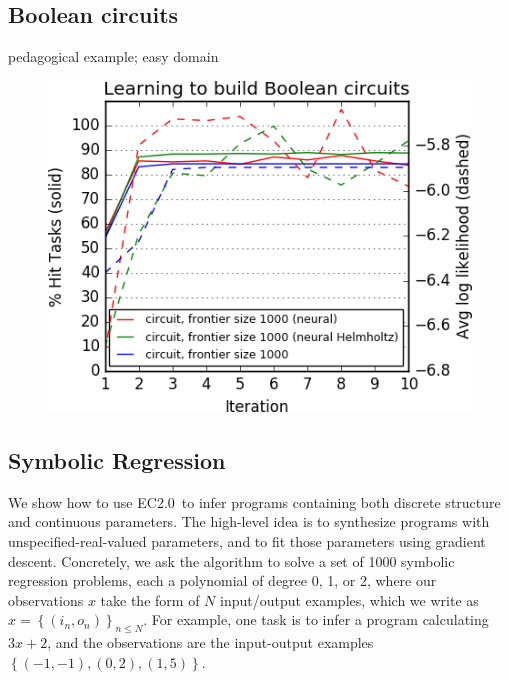 \documentclass{article}
\newcommand{\system}{EC2.0~}
\begin{document}
\subsection{Boolean circuits}
pedagogical example; easy domain
\begin{figure}
  \includegraphics[width = \columnwidth]{figures/circuit.png} 
\end{figure}

\subsection{Symbolic Regression}
We show how to use \system to infer programs containing both discrete
structure and continuous parameters. The high-level idea is to synthesize programs with unspecified-real-valued parameters, and to fit those parameters using gradient descent.
Concretely, we ask the algorithm to
solve a set of 1000 symbolic regression problems, each a polynomial of
degree 0, 1, or 2, where our observations $x$ take the form of $N$
input/output examples, which we write as $x = \left\{(i_n,o_n)
\right\}_{n\leq N}$. For example, one task is to infer a program
calculating $3x + 2$, and the observations are the input-output
examples $\left\{(-1,-1),(0,2),(1,5) \right\}$.
\end{document}

